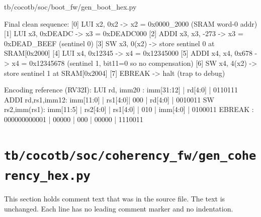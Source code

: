 \begin{relocated}{tb/cocotb/soc/boot_fw/gen_boot_hex.py}
\begin{textblock}
Final clean sequence:
[0]  LUI  x2, 0x2        -> x2 = 0x0000_2000   (SRAM word-0 addr)
[1]  LUI  x3, 0xDEADC    -> x3 = 0xDEADC000
[2]  ADDI x3, x3, -273   -> x3 = 0xDEAD_BEEF   (sentinel 0)
[3]  SW   x3, 0(x2)      -> store sentinel 0 at SRAM[0x2000]
[4]  LUI  x4, 0x12345    -> x4 = 0x12345000
[5]  ADDI x4, x4, 0x678  -> x4 = 0x12345678    (sentinel 1, bit11=0 so no compensation)
[6]  SW   x4, 4(x2)      -> store sentinel 1 at SRAM[0x2004]
[7]  EBREAK               -> halt (trap to debug)

Encoding reference (RV32I):
LUI  rd, imm20   : imm[31:12] | rd[4:0] | 0110111
ADDI rd,rs1,imm12: imm[11:0]  | rs1[4:0]| 000 | rd[4:0] | 0010011
SW   rs2,imm(rs1): imm[11:5] | rs2[4:0] | rs1[4:0] | 010 | imm[4:0] | 0100011
EBREAK           : 000000000001 | 00000 | 000 | 00000 | 1110011
\end{textblock}

\end{relocated}

\section{\texttt{tb/cocotb/soc/coherency\_fw/gen\_coherency\_hex.py}}\label{tm:suite:soc-coherency-fw-gen-coherency-hex}

This section holds comment text that was in the source file. The text is unchanged. Each line has no leading comment marker and no indentation.

